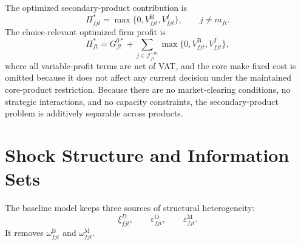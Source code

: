 \documentclass[11pt,a4paper]{article}
\newcommand{\mc}{\mathcal}
\newcommand{\M}{\mathrm{M}}
\newcommand{\B}{\mathrm{B}}
\newcommand{\OFC}{\mathrm{O}}
\begin{document}
The optimized secondary-product contribution is
\begin{equation}
    \Pi^*_{fjt}=\max\{0,V^{\B}_{fjt},V^{I}_{fjt}\},
    \qquad j\neq m_{ft}.
    \label{eq:secondary_profit}
\end{equation}
The choice-relevant optimized firm profit is
\begin{equation}
    \Pi^*_{ft}=G^{0*}_{ft}
    +\sum_{j\in\mc{J}^{-m}_{ft}}\max\{0,V^{\B}_{fjt},V^{I}_{fjt}\},
    \label{eq:firm_profit}
\end{equation}
where all variable-profit terms are net of VAT, and the core make fixed cost is omitted because it does not affect any current decision under the maintained core-product restriction. Because there are no market-clearing conditions, no strategic interactions, and no capacity constraints, the secondary-product problem is additively separable across products.

\section{Shock Structure and Information Sets}
\label{sec:shocks}

The baseline model keeps three sources of structural heterogeneity:
\begin{equation}
    \xi^D_{fjt},
    \qquad
    \varepsilon^{\OFC}_{fjt},
    \qquad
    \varepsilon^{\M}_{fjt}.
\end{equation}
It removes $\omega^{\B}_{fjt}$ and $\omega^{\M}_{fjt}$.
\end{document}
